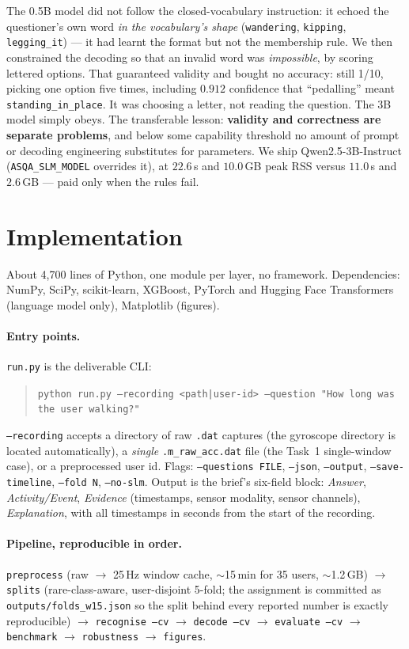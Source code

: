 \documentclass[11pt,a4paper]{article}
\newcommand{\code}[1]{\texttt{\small #1}}
\begin{document}
The 0.5B model did not follow the closed-vocabulary instruction: it echoed the
questioner's own word \emph{in the vocabulary's shape} (\code{wandering}, \code{kipping},
\code{legging\_it}) --- it had learnt the format but not the membership rule. We then
constrained the decoding so that an invalid word was \emph{impossible}, by scoring
lettered options. That guaranteed validity and bought no accuracy: still 1/10, picking
one option five times, including $0.912$ confidence that ``pedalling'' meant
\code{standing\_in\_place}. It was choosing a letter, not reading the question. The 3B
model simply obeys. The transferable lesson: \textbf{validity and correctness are
separate problems}, and below some capability threshold no amount of prompt or decoding
engineering substitutes for parameters. We ship Qwen2.5-3B-Instruct
(\code{ASQA\_SLM\_MODEL} overrides it), at $22.6$\,s and $10.0$\,GB peak RSS versus
$11.0$\,s and $2.6$\,GB --- paid only when the rules fail.

\section{Implementation}

About 4{,}700 lines of Python, one module per layer, no framework. Dependencies: NumPy,
SciPy, scikit-learn, XGBoost, PyTorch and Hugging Face Transformers (language model
only), Matplotlib (figures).

\paragraph{Entry points.} \code{run.py} is the deliverable CLI:
\begin{quote}\small
\code{python run.py --recording <path|user-id> --question "How long was the user walking?"}
\end{quote}
\code{--recording} accepts a directory of raw \code{.dat} captures (the gyroscope
directory is located automatically), a \emph{single} \code{.m\_raw\_acc.dat} file (the
Task~1 single-window case), or a preprocessed user id. Flags: \code{--questions FILE},
\code{--json}, \code{--output}, \code{--save-timeline}, \code{--fold N},
\code{--no-slm}. Output is the brief's six-field block: \emph{Answer},
\emph{Activity/Event}, \emph{Evidence} (timestamps, sensor modality, sensor channels),
\emph{Explanation}, with all timestamps in seconds from the start of the recording.

\paragraph{Pipeline, reproducible in order.}
\code{preprocess} (raw $\rightarrow$ 25\,Hz window cache, $\sim$15\,min for 35 users,
$\sim$1.2\,GB) $\rightarrow$ \code{splits} (rare-class-aware, user-disjoint 5-fold;
the assignment is committed as \code{outputs/folds\_w15.json} so the split behind every
reported number is exactly reproducible) $\rightarrow$ \code{recognise --cv} $\rightarrow$
\code{decode --cv} $\rightarrow$ \code{evaluate --cv} $\rightarrow$ \code{benchmark}
$\rightarrow$ \code{robustness} $\rightarrow$ \code{figures}.
\end{document}
